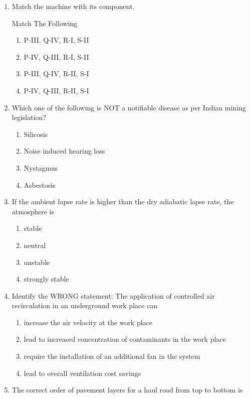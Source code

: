 \documentclass[journal,12pt,onecolumn]{IEEEtran}
\theoremstyle{remark}
\begin{document}
\begin{enumerate}
\item Match the machine with its component.
\begin{table}[H]
  \centering
  \caption{Match The Following}
  
  \label{tab:table2}
\end{table}
\hfill{}
\begin{multicols}{2}
\begin{enumerate}
\item P-III, Q-IV, R-I, S-II  
\item P-IV, Q-III, R-I, S-II  
\item P-III, Q-IV, R-II, S-I 
\item P-IV, Q-III, R-II, S-I 
\end{enumerate}
\end{multicols}
\item Which one of the following is NOT a notifiable disease as per Indian mining legislation?

\hfill{}
\begin{multicols}{2}
\begin{enumerate}
\item Silicosis
\item Noise induced hearing loss
\item Nystagmus 
\item Asbestosis 
\end{enumerate}
\end{multicols}

\item If the ambient lapse rate is higher than the dry adiabatic lapse rate, the atmosphere is 

\hfill{}
\begin{multicols}{4}
\begin{enumerate}
\item stable
\item neutral 
\item unstable 
\item strongly stable
\end{enumerate}
\end{multicols}

\item Identify the WRONG statement:
The application of controlled air recirculation in an underground work place can

\hfill{}
\begin{enumerate}
\item increase the air velocity at the work place 
\item lead to increased concentration of contaminants in the work place
\item require the installation of an additional fan in the system
\item lead to overall ventilation cost savings
\end{enumerate}
\item The correct order of pavement layers for a haul road from top to bottom is 


\end{enumerate}
\end{document}
